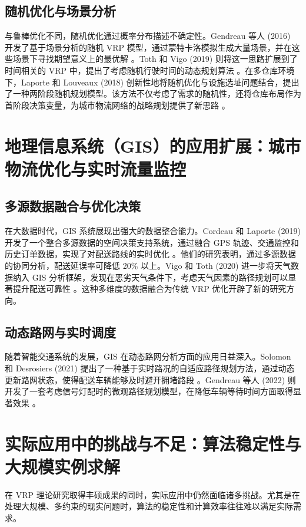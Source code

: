 \documentclass[12pt,a4paper,twoside]{ctexbook}
\begin{document}
\subsection{随机优化与场景分析}
与鲁棒优化不同，随机优化通过概率分布描述不确定性。Gendreau 等人 (2016) 开发了基于场景分析的随机 VRP 模型，通过蒙特卡洛模拟生成大量场景，并在这些场景下寻找期望意义上的最优解 \cite{5}。Toth 和 Vigo (2019) 则将这一思路扩展到了时间相关的 VRP 中，提出了考虑随机行驶时间的动态规划算法 \cite{6}。在多仓库环境下，Laporte 和 Louveaux (2018) 创新性地将随机优化与设施选址问题结合，提出了一种两阶段随机规划模型。该方法不仅考虑了需求的随机性，还将仓库布局作为首阶段决策变量，为城市物流网络的战略规划提供了新思路 \cite{7}。

\section{地理信息系统（GIS）的应用扩展：城市物流优化与实时流量监控}

\subsection{多源数据融合与优化决策}
在大数据时代，GIS 系统展现出强大的数据整合能力。Cordeau 和 Laporte (2019) 开发了一个整合多源数据的空间决策支持系统，通过融合 GPS 轨迹、交通监控和历史订单数据，实现了对配送路线的实时优化 \cite{8}。他们的研究表明，通过多源数据的协同分析，配送延误率可降低 20\% 以上。Vigo 和 Toth (2020) 进一步将天气数据纳入 GIS 分析框架，发现在恶劣天气条件下，考虑天气因素的路径规划可以显著提升配送可靠性 \cite{9}。这种多维度的数据融合为传统 VRP 优化开辟了新的研究方向。

\subsection{动态路网与实时调度}
随着智能交通系统的发展，GIS 在动态路网分析方面的应用日益深入。Solomon 和 Desrosiers (2021) 提出了一种基于实时路况的自适应路径规划方法，通过动态更新路网状态，使得配送车辆能够及时避开拥堵路段 \cite{10}。Gendreau 等人 (2022) 则开发了一套考虑信号灯配时的微观路径规划模型，在降低车辆等待时间方面取得显著效果 \cite{11}。

\section{实际应用中的挑战与不足：算法稳定性与大规模实例求解}
在 VRP 理论研究取得丰硕成果的同时，实际应用中仍然面临诸多挑战。尤其是在处理大规模、多约束的现实问题时，算法的稳定性和计算效率往往难以满足实际需求。
\end{document}
